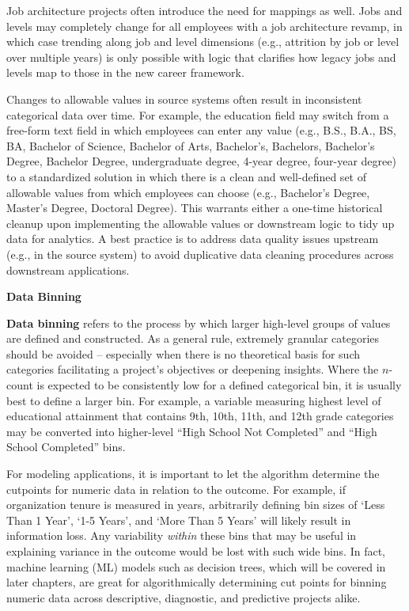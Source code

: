 \documentclass[]{book}
\begin{document}
Job architecture projects often introduce the need for mappings as well. Jobs and levels may completely change for all employees with a job architecture revamp, in which case trending along job and level dimensions (e.g., attrition by job or level over multiple years) is only possible with logic that clarifies how legacy jobs and levels map to those in the new career framework.

Changes to allowable values in source systems often result in inconsistent categorical data over time. For example, the education field may switch from a free-form text field in which employees can enter any value (e.g., B.S., B.A., BS, BA, Bachelor of Science, Bachelor of Arts, Bachelor's, Bachelors, Bachelor's Degree, Bachelor Degree, undergraduate degree, 4-year degree, four-year degree) to a standardized solution in which there is a clean and well-defined set of allowable values from which employees can choose (e.g., Bachelor's Degree, Master's Degree, Doctoral Degree). This warrants either a one-time historical cleanup upon implementing the allowable values or downstream logic to tidy up data for analytics. A best practice is to address data quality issues upstream (e.g., in the source system) to avoid duplicative data cleaning procedures across downstream applications.

\textbf{Data Binning}

\textbf{Data binning} refers to the process by which larger high-level groups of values are defined and constructed. As a general rule, extremely granular categories should be avoided -- especially when there is no theoretical basis for such categories facilitating a project's objectives or deepening insights. Where the \(n\)-count is expected to be consistently low for a defined categorical bin, it is usually best to define a larger bin. For example, a variable measuring highest level of educational attainment that contains 9th, 10th, 11th, and 12th grade categories may be converted into higher-level ``High School Not Completed'' and ``High School Completed'' bins.

For modeling applications, it is important to let the algorithm determine the cutpoints for numeric data in relation to the outcome. For example, if organization tenure is measured in years, arbitrarily defining bin sizes of `Less Than 1 Year', `1-5 Years', and `More Than 5 Years' will likely result in information loss. Any variability \emph{within} these bins that may be useful in explaining variance in the outcome would be lost with such wide bins. In fact, machine learning (ML) models such as decision trees, which will be covered in later chapters, are great for algorithmically determining cut points for binning numeric data across descriptive, diagnostic, and predictive projects alike.
\end{document}
